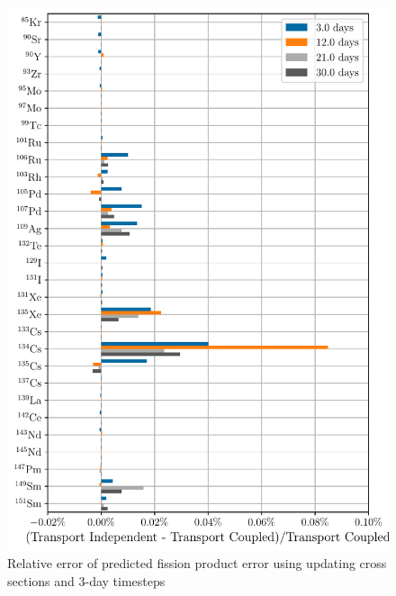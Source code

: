     \begin{figure}[htpb]
        \centering
        \includegraphics[width=\linewidth]{figs/fission_products_updating_xs_predictor_fission_q_days.pdf}
        \caption{Relative error of predicted fission product error using
        updating cross sections and 3-day timesteps}
        \label{fig:fp-error-updating-xs-days}
    \end{figure}
 
